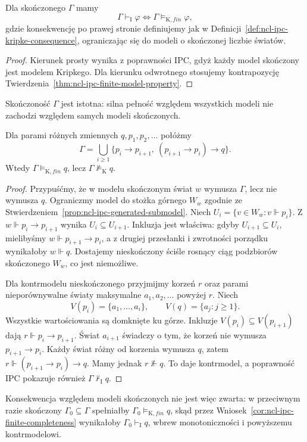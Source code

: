 \begin{wniosek}
\label{cor:ncl-ipc-finite-completeness}
Dla skończonego $\Gamma$ mamy
\[
 \Gamma\vdash_{\mathrm I}\varphi
 \iff \Gamma\models_{\mathrm K,fin}\varphi,
\]
gdzie konsekwencję po prawej stronie definiujemy
jak w Definicji~\ref{def:ncl-ipc-kripke-consequence},
ograniczając się do modeli o skończonej liczbie światów.
\end{wniosek}
\begin{proof}
Kierunek prosty wynika z poprawności IPC, gdyż
każdy model skończony jest modelem Kripkego.
Dla kierunku odwrotnego stosujemy kontrapozycję
Twierdzenia~\ref{thm:ncl-ipc-finite-model-property}.
\end{proof}
Skończoność $\Gamma$ jest istotna: silna pełność
względem wszystkich modeli nie zachodzi względem
samych modeli skończonych.

\begin{przyklad}
\label{ex:ncl-ipc-no-strong-finite-completeness}
Dla parami różnych zmiennych $q,p_1,p_2,\ldots$ połóżmy
\[
 \Gamma=\bigcup_{i\geq1}
 \{p_i\to p_{i+1},\ (p_{i+1}\to p_i)\to q\}.
\]
Wtedy $\Gamma\models_{\mathrm K,fin}q$, lecz
$\Gamma\not\models_{\mathrm K}q$.
\end{przyklad}
\begin{proof}
Przypuśćmy, że w modelu skończonym świat $w$ wymusza
$\Gamma$, lecz nie wymusza $q$. Ograniczmy model do
stożka górnego $W_w$ zgodnie ze
Stwierdzeniem~\ref{prop:ncl-ipc-generated-submodel}.
Niech $U_i=\{v\in W_w:v\Vdash p_i\}$.
Z $w\Vdash p_i\to p_{i+1}$ wynika
$U_i\subseteq U_{i+1}$. Inkluzja jest właściwa:
gdyby $U_{i+1}\subseteq U_i$, mielibyśmy
$w\Vdash p_{i+1}\to p_i$, a z drugiej przesłanki
i zwrotności porządku wynikałoby $w\Vdash q$.
Dostajemy nieskończony ściśle rosnący ciąg podzbiorów
skończonego $W_w$, co jest niemożliwe.

Dla kontrmodelu nieskończonego przyjmijmy korzeń $r$
oraz parami nieporównywalne światy maksymalne
$a_1,a_2,\ldots$ powyżej $r$. Niech
\[
 V(p_i)=\{a_1,\ldots,a_i\},\qquad
 V(q)=\{a_j:j\geq1\}.
\]
Wszystkie wartościowania są domknięte ku górze.
Inkluzje $V(p_i)\subseteq V(p_{i+1})$ dają
$r\Vdash p_i\to p_{i+1}$.
Świat $a_{i+1}$ świadczy o tym, że korzeń nie
wymusza $p_{i+1}\to p_i$. Każdy świat różny od
korzenia wymusza $q$, zatem
$r\Vdash(p_{i+1}\to p_i)\to q$.
Mamy jednak $r\not\Vdash q$. To daje kontrmodel,
a poprawność IPC pokazuje również
$\Gamma\nvdash_{\mathrm I}q$.
\end{proof}
Konsekwencja względem modeli skończonych nie jest
więc zwarta: w przeciwnym razie skończony
$\Gamma_0\subseteq\Gamma$ spełniałby
$\Gamma_0\models_{\mathrm K,fin}q$, skąd przez
Wniosek~\ref{cor:ncl-ipc-finite-completeness}
wynikałoby $\Gamma_0\vdash_{\mathrm I}q$,
wbrew monotoniczności i powyższemu kontrmodelowi.

